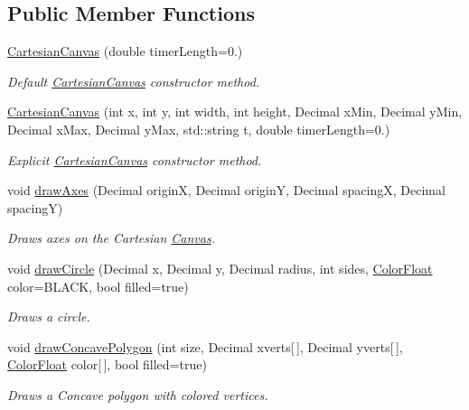\subsection*{Public Member Functions}
\begin{DoxyCompactItemize}
\item 
\hyperlink{classtsgl_1_1_cartesian_canvas_a4438f368eae3def6a70e0faa15d28daa}{Cartesian\-Canvas} (double timer\-Length=0.)
\begin{DoxyCompactList}\small\item\em Default \hyperlink{classtsgl_1_1_cartesian_canvas}{Cartesian\-Canvas} constructor method. \end{DoxyCompactList}\item 
\hyperlink{classtsgl_1_1_cartesian_canvas_a7ca80bfa69d89fdbe110a7ec3aa6f100}{Cartesian\-Canvas} (int x, int y, int width, int height, Decimal x\-Min, Decimal y\-Min, Decimal x\-Max, Decimal y\-Max, std\-::string t, double timer\-Length=0.)
\begin{DoxyCompactList}\small\item\em Explicit \hyperlink{classtsgl_1_1_cartesian_canvas}{Cartesian\-Canvas} constructor method. \end{DoxyCompactList}\item 
void \hyperlink{classtsgl_1_1_cartesian_canvas_a1b08e3c0d692603fd2bf56e38eb19907}{draw\-Axes} (Decimal origin\-X, Decimal origin\-Y, Decimal spacing\-X, Decimal spacing\-Y)
\begin{DoxyCompactList}\small\item\em Draws axes on the Cartesian \hyperlink{classtsgl_1_1_canvas}{Canvas}. \end{DoxyCompactList}\item 
void \hyperlink{classtsgl_1_1_cartesian_canvas_a64e128195cbcf9b60dbe478d6f489d67}{draw\-Circle} (Decimal x, Decimal y, Decimal radius, int sides, \hyperlink{structtsgl_1_1_color_float}{Color\-Float} color=B\-L\-A\-C\-K, bool filled=true)
\begin{DoxyCompactList}\small\item\em Draws a circle. \end{DoxyCompactList}\item 
void \hyperlink{classtsgl_1_1_cartesian_canvas_a7f84b79ab6fd77277c5c71fce7d0ec6a}{draw\-Concave\-Polygon} (int size, Decimal xverts\mbox{[}$\,$\mbox{]}, Decimal yverts\mbox{[}$\,$\mbox{]}, \hyperlink{structtsgl_1_1_color_float}{Color\-Float} color\mbox{[}$\,$\mbox{]}, bool filled=true)
\begin{DoxyCompactList}\small\item\em Draws a Concave polygon with colored vertices. \end{DoxyCompactList}\item 

\end{DoxyCompactItemize}
